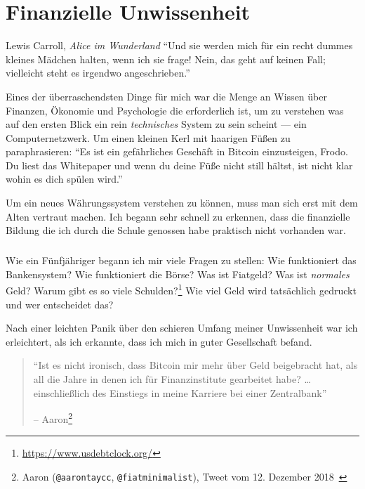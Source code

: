 \chapter{Finanzielle Unwissenheit}
\label{les:8}

\begin{chapquote}{Lewis Carroll, \textit{Alice im Wunderland}}
\enquote{Und sie werden mich für ein recht dummes kleines Mädchen halten, wenn ich sie frage! Nein, das geht auf keinen Fall; vielleicht steht es irgendwo angeschrieben.}
\end{chapquote}

Eines der überraschendsten Dinge für mich war die Menge an Wissen über Finanzen,
Ökonomie und Psychologie die erforderlich ist, um zu verstehen was auf den
ersten Blick ein rein \textit{technisches} System zu sein scheint --- ein
Computernetzwerk. Um einen kleinen Kerl mit haarigen Füßen zu paraphrasieren:
\enquote{Es ist ein gefährliches Geschäft in Bitcoin einzusteigen, Frodo. Du
liest das Whitepaper und wenn du deine Füße nicht still hältst, ist nicht klar
wohin es dich spülen wird.}

Um ein neues Währungssystem verstehen zu können, muss man sich erst mit dem
Alten vertraut machen. Ich begann sehr schnell zu erkennen, dass die finanzielle
Bildung die ich durch die Schule genossen habe praktisch nicht vorhanden war.

\paragraph{}
Wie ein Fünfjähriger begann ich mir viele Fragen zu stellen: Wie funktioniert
das Bankensystem? Wie funktioniert die Börse? Was ist Fiatgeld? Was ist
\textit{normales} Geld? Warum gibt es so viele
Schulden?\footnote{\url{https://www.usdebtclock.org/}} Wie viel Geld wird
tatsächlich gedruckt und wer entscheidet das?

\newpage

Nach einer leichten Panik über den schieren Umfang meiner Unwissenheit war ich
erleichtert, als ich erkannte, dass ich mich in guter Gesellschaft befand.

\begin{quotation}\begin{samepage}
\enquote{Ist es nicht ironisch, dass Bitcoin mir mehr über Geld beigebracht hat,
als all die Jahre in denen ich für Finanzinstitute gearbeitet habe? \ldots
einschließlich des Einstiegs in meine Karriere bei einer Zentralbank}
\begin{flushright} -- Aaron\footnote{Aaron (\texttt{@aarontaycc}, \texttt{@fiatminimalist}), Tweet vom 12. Dezember 2018~\cite{aarontaycc-tweet}}
\end{flushright}\end{samepage}\end{quotation}

